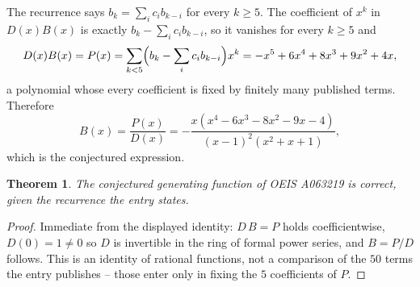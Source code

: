 \documentclass[11pt,a4paper]{article}
\theoremstyle{plain}
\newtheorem{theorem}{Theorem}
\theoremstyle{definition}
\begin{document}
The recurrence says $b_k=\sum_i c_ib_{k-i}$ for every $k\ge 5$. The coefficient of $x^k$ in
$D(x)B(x)$ is exactly $b_k-\sum_i c_ib_{k-i}$, so it vanishes for every $k\ge 5$ and
\[
  D(x)B(x)=P(x)=\sum_{k<5}\Bigl(b_k-\sum_i c_ib_{k-i}\Bigr)x^k
         =- x^{5} + 6 x^{4} + 8 x^{3} + 9 x^{2} + 4 x ,
\]
a polynomial whose every coefficient is fixed by finitely many published terms. Therefore
\[
  B(x)=\frac{P(x)}{D(x)}=- \frac{x \left(x^{4} - 6 x^{3} - 8 x^{2} - 9 x - 4\right)}{\left(x - 1\right)^{2} \left(x^{2} + x + 1\right)} ,
\]
which is the conjectured expression.

\begin{theorem}
The conjectured generating function of OEIS A063219 is correct, given the recurrence the entry
states.
\end{theorem}

\begin{proof}
Immediate from the displayed identity: $D\,B=P$ holds coefficientwise, $D(0)=1\ne0$ so $D$ is
invertible in the ring of formal power series, and $B=P/D$ follows. This is an identity of
rational functions, not a comparison of the $50$ terms the entry publishes -- those
enter only in fixing the $5$ coefficients of $P$.
\end{proof}
\end{document}
